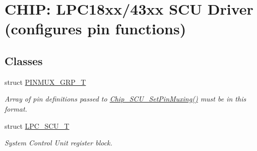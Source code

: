 \hypertarget{group___s_c_u__18_x_x__43_x_x}{}\section{C\+H\+IP\+: L\+P\+C18xx/43xx S\+CU Driver (configures pin functions)}
\label{group___s_c_u__18_x_x__43_x_x}
\subsection*{Classes}
\begin{DoxyCompactItemize}
\item 
struct \hyperlink{struct_p_i_n_m_u_x___g_r_p___t}{P\+I\+N\+M\+U\+X\+\_\+\+G\+R\+P\+\_\+T}
\begin{DoxyCompactList}\small\item\em Array of pin definitions passed to \hyperlink{group___s_c_u__18_x_x__43_x_x_ga118ccc4ab5b115c5e8c7ce457eb85536}{Chip\+\_\+\+S\+C\+U\+\_\+\+Set\+Pin\+Muxing()} must be in this format. \end{DoxyCompactList}\item 
struct \hyperlink{struct_l_p_c___s_c_u___t}{L\+P\+C\+\_\+\+S\+C\+U\+\_\+T}
\begin{DoxyCompactList}\small\item\em System Control Unit register block. \end{DoxyCompactList}\end{DoxyCompactItemize}
